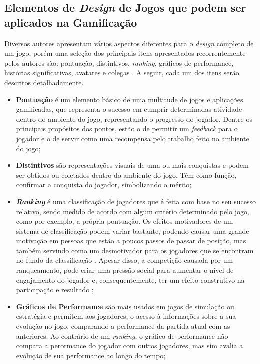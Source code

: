 \subsection{Elementos de \textit{Design} de Jogos que podem ser aplicados na Gamificação}
\label{gamification_elements}

Diversos autores apresentam vários aspectos diferentes para o \textit{design} completo de um jogo, porém uma seleção dos principais itens apresentados recorrentemente pelos autores são: pontuação, distintivos, \textit{ranking}, gráficos de performance, histórias significativas, avatares e colegas \cite{gamification_motivates}. A seguir, cada um dos itens serão descritos detalhadamente.

\begin{itemize}
    \item \textbf{Pontuação} é um elemento básico de uma multitude de jogos e aplicações gamificadas, que representa o sucesso em cumprir  determinadas atividade dentro do ambiente do jogo, representando o progresso do jogador. Dentre os principais propósitos dos pontos, estão o de permitir um \textit{feedback} para o jogador e o de servir como uma recompensa pelo trabalho feito no ambiente do jogo;
    \item \textbf{Distintivos} são representações visuais de uma ou mais conquistas e podem ser obtidos ou coletados dentro do ambiente do jogo. Têm como função, confirmar a conquista do jogador, simbolizando o mérito;
    \item \textbf{\textit{Ranking}} é uma classificação de jogadores que é feita com base no seu sucesso relativo, sendo medido de acordo com algum critério determinado pelo jogo, como por exemplo, a própria pontuação. Os efeitos motivadores de um sistema de classificação podem variar bastante, podendo causar uma grande motivação em pessoas que estão a poucos passos de passar de posição, mas também servindo como um desmotivador para os jogadores que se encontram no fundo da classificação \cite{ranking_motivation}. Apesar disso, a competição causada por um ranqueamento, pode criar uma pressão social para aumentar o nível de engajamento do jogador e, consequentemente, ter um efeito construtivo na participação e resultado \cite{ranking_competition};
    \item \textbf{Gráficos de Performance} são mais usados em jogos de simulação ou estratégia e permitem aos jogadores, o acesso à informações sobre a sua evolução no jogo, comparando a performance da partida atual com as anteriores. Ao contrário de um \textit{ranking}, o gráfico de performance não compara a perormance do jogador com outros jogadores, mas sim avalia a evolução de sua performance ao longo do tempo;

\end{itemize}
